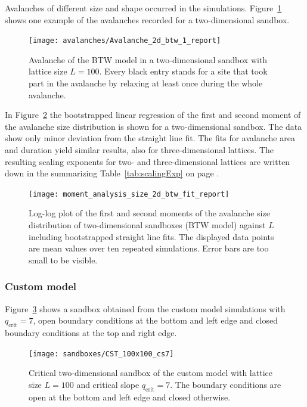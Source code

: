Avalanches of different size and shape occurred in the simulations. Figure~\ref{fig:btw2DAvalanche} shows one example
of the avalanches recorded for a two-dimensional sandbox.
\begin{figure}[htb]
    \centering
    \texttt{[image: avalanches/Avalanche\_2d\_btw\_1\_report]}
    \caption{Avalanche of the BTW model in a two-dimensional sandbox with lattice size $L=100$.
             Every black entry stands for a site that took part in the avalanche by relaxing
             at least once during the whole avalanche.}
    \label{fig:btw2DAvalanche}
\end{figure}

In Figure~\ref{fig:btwSizeFit} the bootstrapped linear regression of the first and second moment of the avalanche size
distribution is shown for a two-dimensional sandbox. The data show only minor deviation from the straight line fit.
The fits for avalanche area and duration yield similar results, also for three-dimensional lattices.
The resulting scaling exponents for two- and three-dimensional lattices are written down in the summarizing
Table~\ref{tab:scalingExp} on page \pageref{tab:scalingExp}.
\begin{figure}[htb]
    \centering
    \texttt{[image: moment\_analysis\_size\_2d\_btw\_fit\_report]}
    \caption{Log-log plot of the first and second moments of the avalanche size distribution of two-dimensional
             sandboxes (BTW model) against $L$ including bootstrapped straight line fits.
             The displayed data points are mean values over ten repeated simulations.
             Error bars are too small to be visible.}
    \label{fig:btwSizeFit}
\end{figure}

\subsubsection{Custom model}
Figure~\ref{fig:customSandbox} shows a sandbox obtained from the custom model simulations with $q_{\mathrm{crit}}=7$,
open boundary conditions at the bottom and left edge and closed boundary conditions at the top and right edge.
\begin{figure}[htb]
    \centering
    \texttt{[image: sandboxes/CST\_100x100\_cs7]}
    \caption{Critical two-dimensional sandbox of the custom model with lattice size $L=100$ and
             critical slope $q_{\mathrm{crit}}=7$.
             The boundary conditions are open at the bottom and left edge and closed otherwise.}
    \label{fig:customSandbox}
\end{figure}

